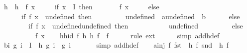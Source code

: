 \begin{isabellebody}
\ h\ \ {\isachardoublequoteopen}h\ {\isacharequal}{\kern0pt}\ {\isacharparenleft}{\kern0pt}{\isasymlambda}f\ x{\isachardot}{\kern0pt}\ \isanewline
\ \ \ \ if\ x\ {\isasymin}\ I\ then\ \isanewline
\ \ \ \ \ \ f\ x\ \isanewline
\ \ \ \ else\ {\isacharparenleft}{\kern0pt}\isanewline
\ \ \ \ \ \ if\ {\isacharparenleft}{\kern0pt}f\ x{\isacharparenright}{\kern0pt}\ {\isacharequal}{\kern0pt}\ undefined\ then\ \isanewline
\ \ \ \ \ \ \ \ {\isacharparenleft}{\kern0pt}undefined\ {\isacharcolon}{\kern0pt}{\isacharcolon}{\kern0pt}\ {\isacharprime}{\kern0pt}a{\isacharcomma}{\kern0pt}undefined\ {\isacharcolon}{\kern0pt}{\isacharcolon}{\kern0pt}\ {\isacharprime}{\kern0pt}b{\isacharparenright}{\kern0pt}\isanewline
\ \ \ \ \ \ else\ {\isacharparenleft}{\kern0pt}\isanewline
\ \ \ \ \ \ \ \ if\ {\isacharparenleft}{\kern0pt}f\ x{\isacharparenright}{\kern0pt}\ {\isacharequal}{\kern0pt}\ {\isacharparenleft}{\kern0pt}undefined{\isacharcomma}{\kern0pt}undefined{\isacharparenright}{\kern0pt}\ then\ \isanewline
\ \ \ \ \ \ \ \ \ \ undefined\ \isanewline
\ \ \ \ \ \ \ \ else\isanewline
\ \ \ \ \ \ \ \ \ \ f\ x{\isacharparenright}{\kern0pt}{\isacharparenright}{\kern0pt}{\isacharparenright}{\kern0pt}{\isachardoublequoteclose}\isanewline
\isanewline
\ \ \isamarkupfalse%
\ h{\isacharunderscore}{\kern0pt}h{\isacharunderscore}{\kern0pt}id{\isacharcolon}{\kern0pt}\ {\isachardoublequoteopen}{\isasymAnd}f{\isachardot}{\kern0pt}\ h\ {\isacharparenleft}{\kern0pt}h\ f{\isacharparenright}{\kern0pt}\ {\isacharequal}{\kern0pt}\ f{\isachardoublequoteclose}\isanewline
\ \ \ \ \isamarkupfalse%
\ {\isacharparenleft}{\kern0pt}rule\ ext{\isacharparenright}{\kern0pt}\isanewline
\ \ \ \ \isamarkupfalse%
\ {\isacharparenleft}{\kern0pt}simp\ add{\isacharcolon}{\kern0pt}h{\isacharunderscore}{\kern0pt}def{\isacharparenright}{\kern0pt}\isanewline
\ \ \isanewline
\ \ \isamarkupfalse%
\ b{\isacharcolon}{\kern0pt}{\isachardoublequoteopen}{\isasymAnd}i\ g{\isachardot}{\kern0pt}\ i\ {\isasymin}\ I\ {\isasymLongrightarrow}\ h\ g\ i\ {\isacharequal}{\kern0pt}\ g\ i{\isachardoublequoteclose}\ \isanewline
\ \ \ \ \isamarkupfalse%
\ {\isacharparenleft}{\kern0pt}simp\ add{\isacharcolon}{\kern0pt}h{\isacharunderscore}{\kern0pt}def{\isacharparenright}{\kern0pt}\isanewline
\isanewline
\ \ \isamarkupfalse%
\ a{\isacharcolon}{\kern0pt}{\isachardoublequoteopen}inj\ {\isacharparenleft}{\kern0pt}{\isasymlambda}f{\isachardot}{\kern0pt}\ {\isacharparenleft}{\kern0pt}fst\ {\isasymcirc}\ h\ f{\isacharcomma}{\kern0pt}\ snd\ {\isasymcirc}\ h\ f{\isacharparenright}{\kern0pt}{\isacharparenright}{\kern0pt}{\isachardoublequoteclose}\isanewline

\end{isabellebody}
